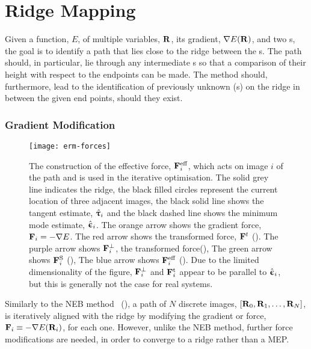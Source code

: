 \section{Ridge Mapping}
\label{sec:ridge-mapping}
Given a function, $E$, of multiple variables, ${\mathrm{\mathbf{\bm{R}}}}$, its gradient, $\nabla E({\mathrm{\mathbf{\bm{R}}}})$, and two s, the goal is to identify a path that lies close to the ridge between the s.
The path should, in particular, lie through any intermediate s so that a comparison of their height with respect to the endpoints can be made.
The method should, furthermore, lead to the identification of previously unknown (s) on the ridge in between the given end points, should they exist.

\subsubsection{Gradient Modification}
\begin{SCfigure}[5.0][h]
\centering
\texttt{[image: erm-forces]}
\caption{
The construction of the effective force, ${\mathrm{\mathbf{\bm{F}}}}^\text{eff}_i$,
which acts on image $i$ of the path and is used in the iterative optimisation.
The solid grey line indicates the ridge,
the black filled circles represent the current location of three adjacent images,
the black solid line shows the tangent estimate, $\hat{{\mathrm{\mathbf{\bm{\uptau}}}}}_i$
and the black dashed line shows the minimum mode estimate, $\hat{{\mathrm{\mathbf{\bm{\upepsilon}}}}}_i$.
The orange arrow shows the gradient force, ${\mathrm{\mathbf{\bm{F}}}}_i= -\nabla E$.
The red arrow shows the transformed force, ${\mathrm{\mathbf{\bm{F}}}}^t$ ().
The purple arrow shows ${\mathrm{\mathbf{\bm{F}}}}_i^\perp$, the transformed force(),
The green arrow shows ${\mathrm{\mathbf{\bm{F}}}}_i^\text{S}$ (),
The blue arrow shows ${\mathrm{\mathbf{\bm{F}}}}_i^\text{eff}$ ().
Due to the limited dimensionality of the figure, ${\mathrm{\mathbf{\bm{F}}}}_i^\perp$ and ${\mathrm{\mathbf{\bm{F}}}}_i^\text{t}$ appear to be parallel to $\hat{{\mathrm{\mathbf{\bm{\upepsilon}}}}}_i$, but this is generally not the case for real systems.
}
\label{fig:erm-forces}
\end{SCfigure}

Similarly to the NEB method~\cite{neb-original-1998} (), a path of $N$ discrete images, $[{\mathrm{\mathbf{\bm{R}}}}_0, {\mathrm{\mathbf{\bm{R}}}}_1, \ldots, {\mathrm{\mathbf{\bm{R}}}}_N]$, is iteratively aligned with the ridge by modifying the gradient or force, ${\mathrm{\mathbf{\bm{F}}}}_i \equiv -\nabla E({\mathrm{\mathbf{\bm{R}}}}_i)$, for each one.
However, unlike the NEB method, further force modifications are needed, in order to converge to a ridge rather than a MEP.

